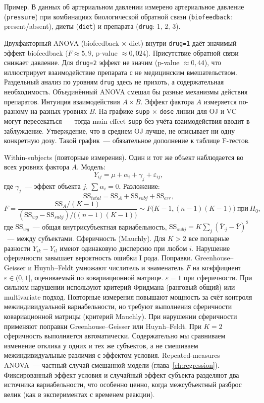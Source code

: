 Пример. В данных об артериальном давлении измерено артериальное давление (\texttt{pressure}) при комбинациях биологической обратной связи (\texttt{biofeedback}: present/absent), диеты (\texttt{diet}) и препарата (\texttt{drug}: 1, 2, 3).

Двухфакторный ANOVA (biofeedback $\times$ diet) внутри \texttt{drug=1} даёт значимый эффект biofeedback ($F\approx 5{,}9$, p-value $\approx 0{,}024$). Присутствие обратной связи снижает давление.
Для \texttt{drug=2} эффект не значим (p-value $\approx 0{,}44$), что иллюстрирует взаимодействие препарата с не медицинским вмешательством.
Раздельный анализ по уровням \texttt{drug} здесь не прихоть, а содержательная необходимость. Объединённый ANOVA смешал бы разные механизмы действия препаратов.
Интуиция взаимодействия $A\times B$. Эффект фактора $A$ измеряется по-разному на разных уровнях $B$.
На графике \texttt{supp} $\times$ \texttt{dose} линии для OJ и VC могут пересекаться~--- тогда main effect \texttt{supp} без учёта взаимодействия вводит в заблуждение. Утверждение, что в среднем OJ лучше, не описывает ни одну конкретную дозу.
Такой график~--- обязательное дополнение к таблице F-тестов.

Within-subjects (повторные измерения). Один и тот же объект наблюдается во всех уровнях фактора $A$.
Модель: \[ Y_{ij}=\mu+\alpha_i+\gamma_j+\varepsilon_{ij}, \] где $\gamma_j$~--- эффект объекта $j$, $\sum\alpha_i=0$.
Разложение: \[ \mathrm{SS}_{total}=\mathrm{SS}_A+\mathrm{SS}_{subj}+\mathrm{SS}_{err}, \] \[ F=\frac{\mathrm{SS}_A/(K-1)} {(\mathrm{SS}_{wg}-\mathrm{SS}_{subj})/\bigl((n-1)(K-1)\bigr)} \sim F\bigl(K-1,(n-1)(K-1)\bigr)\ \text{при}\ H_0, \] где $\mathrm{SS}_{wg}$~--- общая внутрисубъектная вариабельность, $\mathrm{SS}_{subj}=K\sum_j(\bar Y_{\cdot j}-\bar Y)^2$~--- между субъектами.
Сферичность (Mauchly). Для $K>2$ все попарные разности $Y_{ik}-Y_{il}$ имеют одинаковую дисперсию при любом $i$.
Нарушение сферичности завышает вероятность ошибки I рода.
Поправки. Greenhouse--Geisser и Huynh--Feldt умножают числитель и знаменатель $F$ на коэффициент $\varepsilon\in(0,1]$, оцениваемый по ковариационной матрице. $\varepsilon=1$ при сферичности.
При сильном нарушении используют критерий Фридмана (ранговый общий) или multivariate подход.
Повторные измерения повышают мощность за счёт контроля межиндивидуальной вариабельности, но требуют выполнения сферичности ковариационной матрицы (критерий Mauchly).
При нарушении сферичности применяют поправки Greenhouse--Geisser или Huynh--Feldt. При $K=2$ сферичность выполняется автоматически.
Содержательно мы сравниваем изменение отклика у одних и тех же субъектов, а не смешиваем межиндивидуальные различия с эффектом условия.
Repeated-measures ANOVA~--- частный случай смешанной модели (глава~\ref{ch:regression}). Фиксированный эффект условия и случайный эффект субъекта разделяют два источника вариабельности, что особенно ценно, когда межсубъектный разброс велик (как в экспериментах с временем реакции).

